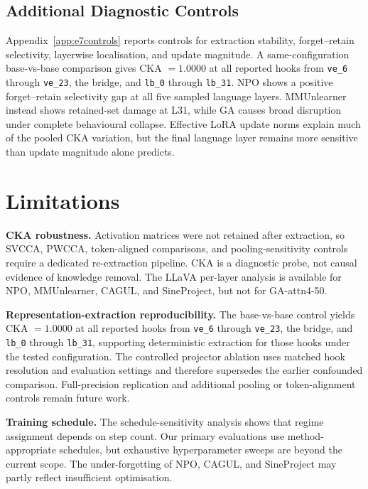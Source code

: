 \documentclass[letterpaper]{article}
\begin{document}
\subsection{Additional Diagnostic Controls}

Appendix~\ref{app:e7controls} reports controls for extraction stability,
forget--retain selectivity, layerwise localisation, and update magnitude.
A same-configuration base-vs-base comparison gives CKA $=1.0000$ at all
reported hooks from \texttt{ve\_6} through \texttt{ve\_23}, the bridge, and
\texttt{lb\_0} through \texttt{lb\_31}. NPO shows a positive forget--retain
selectivity gap at all five sampled language layers. MMUnlearner instead
shows retained-set damage at L31, while GA causes broad disruption under
complete behavioural collapse. Effective LoRA update norms explain much of
the pooled CKA variation, but the final language layer remains more sensitive
than update magnitude alone predicts.

\section{Limitations}

\textbf{CKA robustness.}
Activation matrices were not retained after extraction, so SVCCA, PWCCA,
token-aligned comparisons, and pooling-sensitivity controls require a
dedicated re-extraction pipeline. CKA is a diagnostic probe, not causal
evidence of knowledge removal. The LLaVA per-layer analysis is available for
NPO, MMUnlearner, CAGUL, and SineProject, but not for GA-attn4-50.

\textbf{Representation-extraction reproducibility.}
The base-vs-base control yields CKA $=1.0000$ at all reported hooks from
\texttt{ve\_6} through \texttt{ve\_23}, the bridge, and
\texttt{lb\_0} through \texttt{lb\_31}, supporting deterministic extraction
for those hooks under the tested configuration. The controlled projector
ablation uses matched hook resolution and evaluation settings and therefore
supersedes the earlier confounded comparison. Full-precision replication and
additional pooling or token-alignment controls remain future work.

\textbf{Training schedule.}
The schedule-sensitivity analysis shows that regime assignment depends on
step count. Our primary evaluations use method-appropriate schedules, but
exhaustive hyperparameter sweeps are beyond the current scope. The
under-forgetting of NPO, CAGUL, and SineProject may partly reflect
insufficient optimisation.
\end{document}
